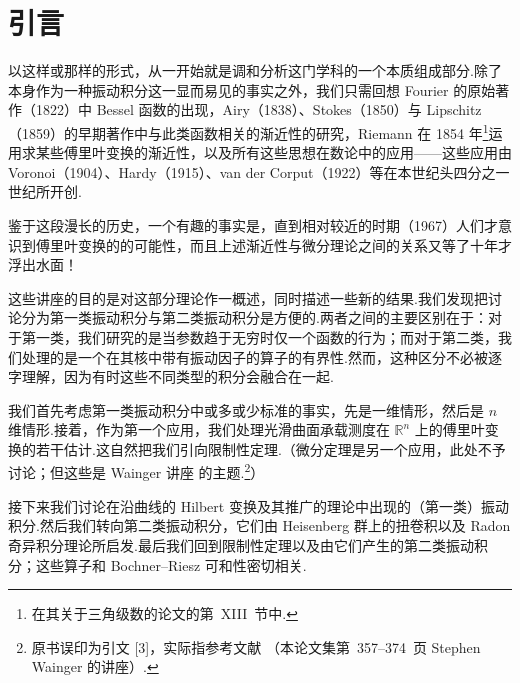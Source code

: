 \documentclass[
  BookTitleCN={傅里叶分析中的振动积分},
  BookTitleEN={Oscillatory Integrals in Fourier Analysis},
  OriginalAuthor={E.~M. Stein},
  OriginalEdition={Proc. Sympos. Pure Math. 35, Part~1},
  OriginalPublisher={American Mathematical Society},
  OriginalYear={1979},
  Translator={翻译及重排},
  ModelUsed={Codex CLI},
  Biblatex=false,
  TranslationDate={2026年8月27日}
]{mathtranslation}
\numberwithin{equation}{chapter}   %
\newcommand{\R}{\mathbb{R}}
\begin{document}
\makecover

\makecontents

\clearpage
\chapter*{引言}


\noindent {}以这样或那样的形式，从一开始就是调和分析这门学科的一个本质组成部分.除了本身作为一种振动积分这一显而易见的事实之外，我们只需回想 Fourier 的原始著作（1822）中 Bessel 函数的出现，Airy（1838）、Stokes（1850）与 Lipschitz（1859）的早期著作中与此类函数相关的渐近性的研究，Riemann 在 1854 年\footnote{在其关于三角级数的论文的第~XIII~节中.}运用求某些傅里叶变换的渐近性，以及所有这些思想在数论中的应用——这些应用由 Voronoi（1904）、Hardy（1915）、van der Corput（1922）等在本世纪头四分之一世纪所开创.

鉴于这段漫长的历史，一个有趣的事实是，直到相对较近的时期（1967）人们才意识到傅里叶变换的的可能性，而且上述渐近性与微分理论之间的关系又等了十年才浮出水面！

这些讲座的目的是对这部分理论作一概述，同时描述一些新的结果.我们发现把讨论分为{\termfont 第一类}振动积分与{\termfont 第二类}振动积分是方便的.两者之间的主要区别在于：对于第一类，我们研究的是当参数趋于无穷时仅一个函数的行为；而对于第二类，我们处理的是一个在其核中带有振动因子的算子的有界性.然而，这种区分不必被逐字理解，因为有时这些不同类型的积分会融合在一起.

我们首先考虑第一类振动积分中或多或少标准的事实，先是一维情形，然后是 $n$ 维情形.接着，作为第一个应用，我们处理光滑曲面承载测度在 $\R^n$ 上的傅里叶变换的若干估计.这自然把我们引向限制性定理.（微分定理是另一个应用，此处不予讨论；但这些是 Wainger 讲座 \cite{ref32} 的主题.\footnote{原书误印为引文 [3]，实际指参考文献 \cite{ref32}（本论文集第~357--374~页 Stephen Wainger 的讲座）.}）

接下来我们讨论在沿曲线的 Hilbert 变换及其推广的理论中出现的（第一类）振动积分.然后我们转向第二类振动积分，它们由 Heisenberg 群上的扭卷积以及 Radon 奇异积分理论所启发.最后我们回到限制性定理以及由它们产生的第二类振动积分；这些算子和 Bochner--Riesz 可和性密切相关.

\end{document}
